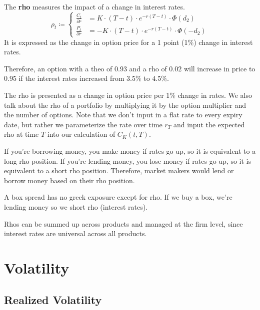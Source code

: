 \documentclass{article}
\begin{document}
    \begin{definition}[Rho]
      The \textbf{rho} measures the impact of a change in interest rates. 
      \begin{equation}
        \rho_t \coloneqq \begin{cases} 
          \frac{C_t}{\partial r} & = K \cdot (T - t) \cdot e^{-r (T - t)} \cdot \Phi(d_2) \\ 
          \frac{P_t}{\partial r} & = -K \cdot (T - t) \cdot e^{-r (T - t)} \cdot \Phi(-d_2)
        \end{cases}
      \end{equation}
      It is expressed as the change in option price for a 1 point (1\%) change in interest rates.  
    \end{definition}

    Therefore, an option with a theo of $0.93$ and a rho of $0.02$ will increase in price to $0.95$ if the interest rates increased from $3.5\%$ to $4.5\%$.  

    The rho is presented as a change in option price per 1\% change in rates. We also talk about the rho of a portfolio by multiplying it by the option multiplier and the number of options. Note that we don't input in a flat rate to every expiry date, but rather we parameterize the rate over time $r_T$ and input the expected rho at time $T$ into our calculation of $C_K (t, T)$.

    If you're borrowing money, you make money if rates go up, so it is equivalent to a long rho position.
    If you're lending money, you lose money if rates go up, so it is equivalent to a short rho position.
    Therefore, market makers would lend or borrow money based on their rho position.

    \begin{example}
      A box spread has no greek exposure except for rho. If we buy a box, we're lending money so we short rho (interest rates).
    \end{example}

    Rhos can be summed up across products and managed at the firm level, since interest rates are universal across all products.

\section{Volatility}

  \subsection{Realized Volatility}
\end{document}
